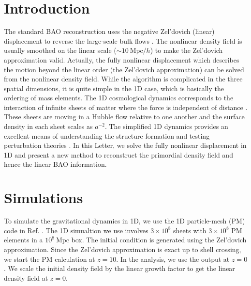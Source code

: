 \documentclass[aps,prd,twocolumn,showpacs,superscriptaddress,groupedaddress,nofootinbib]{revtex4}  %
\newcommand{\mr}{\mathrm}
\begin{document}
\section{Introduction}
The standard BAO reconstruction uses the negative
Zel'dovich (linear) displacement to reverse the large-scale bulk flows 
\cite{2007bao}. 
The nonlinear density field is usually smoothed on the linear scale 
($\sim10\ \mr{Mpc}/h$) to make the Zel'dovich approximation valid.
Actually, the fully nonlinear displacement which describes the motion beyond
the linear order (the Zel'dovich approximation) can be solved from the nonlinear
density field.
While the algorithm is complicated in the three spatial dimensions, it is 
quite simple in the 1D case, which is basically the ordering of mass elements.
The 1D cosmological dynamics corresponds to the interaction of infinite sheets
of matter where the force is independent of distance \cite{2016matt}.
These sheets are moving in a Hubble flow relative to one another and the surface
density in each sheet scales as $a^{-2}$.
The simplified 1D dynamics provides an excellent means of understanding the 
structure formation and testing perturbation theories \cite{2016matt}.
In this Letter, we solve the fully nonlinear displacement in 1D and present
a new method to reconstruct the primordial density field and hence the linear 
BAO information.


\section{Simulations}
To simulate the gravitational dynamics in 1D, we use the 
1D particle-mesh (PM) code in Ref. \cite{2016matt}.
The 1D simualtion we use involves $3\times10^8$ sheets with $3\times10^8$ PM
elements in a $10^8\ \mr{Mpc}$ box.
The initial condition is generated using the Zel'dovich approximation.
Since the Zel'dovich approximation is exact up to shell crossing, we start 
the PM calculation at $z=10$. In the analysis, we use the output at $z=0$.
We scale the initial density field by the linear growth factor to get the
linear density field at $z=0$.
\end{document}
